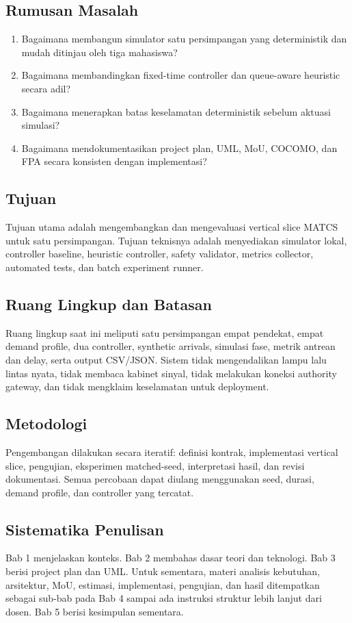 \documentclass[12pt]{article}
\begin{document}
\subsection{Rumusan Masalah}
\begin{enumerate}
  \item Bagaimana membangun simulator satu persimpangan yang deterministik dan mudah ditinjau oleh tiga mahasiswa?
  \item Bagaimana membandingkan fixed-time controller dan queue-aware heuristic secara adil?
  \item Bagaimana menerapkan batas keselamatan deterministik sebelum aktuasi simulasi?
  \item Bagaimana mendokumentasikan project plan, UML, MoU, COCOMO, dan FPA secara konsisten dengan implementasi?
\end{enumerate}

\subsection{Tujuan}
Tujuan utama adalah mengembangkan dan mengevaluasi vertical slice MATCS untuk satu persimpangan. Tujuan teknisnya adalah menyediakan simulator lokal, controller baseline, heuristic controller, safety validator, metrics collector, automated tests, dan batch experiment runner.

\subsection{Ruang Lingkup dan Batasan}
Ruang lingkup saat ini meliputi satu persimpangan empat pendekat, empat demand profile, dua controller, synthetic arrivals, simulasi fase, metrik antrean dan delay, serta output CSV/JSON. Sistem tidak mengendalikan lampu lalu lintas nyata, tidak membaca kabinet sinyal, tidak melakukan koneksi authority gateway, dan tidak mengklaim keselamatan untuk deployment.

\subsection{Metodologi}
Pengembangan dilakukan secara iteratif: definisi kontrak, implementasi vertical slice, pengujian, eksperimen matched-seed, interpretasi hasil, dan revisi dokumentasi. Semua percobaan dapat diulang menggunakan seed, durasi, demand profile, dan controller yang tercatat.

\subsection{Sistematika Penulisan}
Bab 1 menjelaskan konteks. Bab 2 membahas dasar teori dan teknologi. Bab 3 berisi project plan dan UML. Untuk sementara, materi analisis kebutuhan, arsitektur, MoU, estimasi, implementasi, pengujian, dan hasil ditempatkan sebagai sub-bab pada Bab 4 sampai ada instruksi struktur lebih lanjut dari dosen. Bab 5 berisi kesimpulan sementara.
\end{document}
